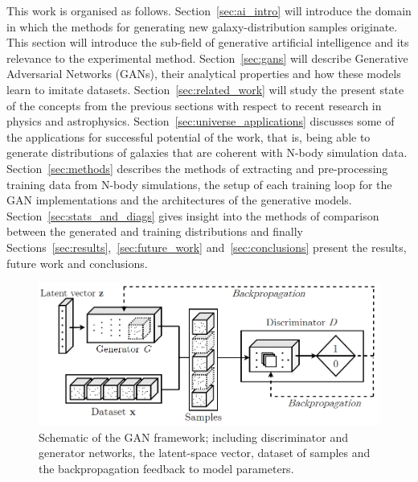 \documentclass[twocolumn]{article}
\numberwithin{equation}{section}
\begin{document}
This work is organised as follows. Section~\ref{sec:ai_intro} will introduce the domain in which the methods for generating new galaxy-distribution samples originate. This section will introduce the sub-field of generative artificial intelligence and its relevance to the experimental method. Section~\ref{sec:gans} will describe Generative Adversarial Networks (GANs), their analytical properties and how these models learn to imitate datasets. Section~\ref{sec:related_work} will study the present state of the concepts from the previous sections with respect to recent research in physics and astrophysics. Section~\ref{sec:universe_applications} discusses some of the applications for successful potential of the work, that is, being able to generate distributions of galaxies that are coherent with N-body simulation data. Section~\ref{sec:methods} describes the methods of extracting and pre-processing training data from N-body simulations, the setup of each training loop for the GAN implementations and the architectures of the generative models. Section~\ref{sec:stats_and_diags} gives insight into the methods of comparison between the generated and training distributions and finally Sections~\ref{sec:results},~\ref{sec:future_work} and~\ref{sec:conclusions} present the results, future work and conclusions.



\begin{figure}
\includegraphics[width=\columnwidth]{figures/diagrams/GAN_diagram1.png}
\centering
\caption{Schematic of the GAN framework; including discriminator and generator networks, the latent-space vector, dataset of samples and the backpropagation feedback to model parameters.}
\label{fig:GAN_diagram}
\end{figure}

\end{document}
